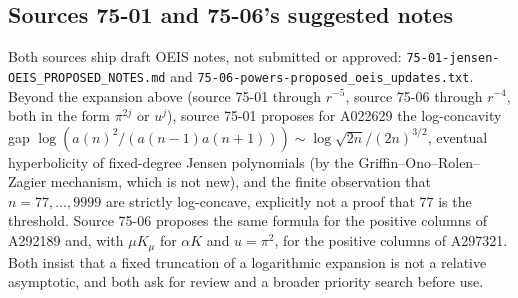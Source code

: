 \documentclass[11pt]{article}
\numberwithin{equation}{section}
\theoremstyle{definition}\newtheorem{definition}[theorem]{Definition}
\theoremstyle{remark}\newtheorem{remark}[theorem]{Remark}
\newcommand{\file}[1]{\nolinkurl{#1}}
\begin{document}
\subsection*{Sources 75-01 and 75-06's suggested notes}
Both sources ship draft OEIS notes, not submitted or approved:
\file{75-01-jensen-OEIS_PROPOSED_NOTES.md} and
\file{75-06-powers-proposed_oeis_updates.txt}.  Beyond the expansion above
(source 75-01 through $r^{-5}$, source 75-06 through $r^{-4}$, both in the
form $\pi^{2j}$ or $u^j$), source 75-01 proposes for A022629 the log-concavity
gap $\log(a(n)^2/(a(n-1)a(n+1)))\sim\log\sqrt{2n}/(2n)^{3/2}$, eventual
hyperbolicity of fixed-degree Jensen polynomials (by the
Griffin--Ono--Rolen--Zagier mechanism, which is not new), and the finite
observation that $n=77,\dots,9999$ are strictly log-concave, explicitly not a
proof that $77$ is the threshold.  Source 75-06 proposes the same formula for
the positive columns of A292189 and, with $\mu K_\mu$ for $\alpha K$ and
$u=\pi^2$, for the positive columns of A297321.  Both insist that a fixed
truncation of a logarithmic expansion is not a relative asymptotic, and both
ask for review and a broader priority search before use.
\end{document}
